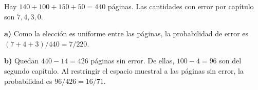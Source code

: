 Hay $140+100+150+50=440$ páginas. Las cantidades con error por capítulo son $7,4,3,0$.

\textbf{a)} Como la elección es uniforme entre las páginas, la probabilidad de error es $(7+4+3)/440=\boxed{7/220}$.

\textbf{b)} Quedan $440-14=426$ páginas sin error. De ellas, $100-4=96$ son del segundo capítulo. Al restringir el espacio muestral a las páginas sin error, la probabilidad es $96/426=\boxed{16/71}$.
